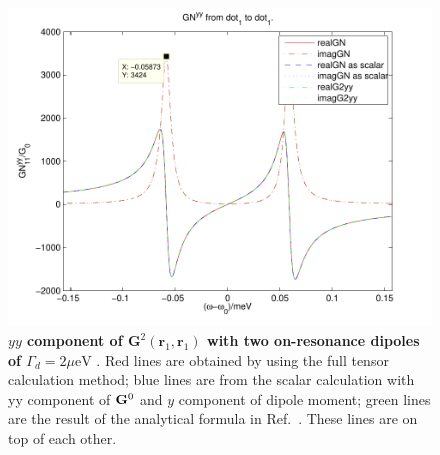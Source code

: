 \begin{figure}[H]
\centering
\begin{center}
\includegraphics[width=14cm]{./Figs/G84_2yy11_1}
\end{center}
\caption[yy component of $G^2(\mathbf{r}_1,\mathbf{r}_1)$  with two on-resonance dipoles.]{\textbf{$yy$ component of $\mathbf{G}^2(\mathbf{r}_1,\mathbf{r}_1)$  with two on-resonance dipoles of $\Gamma_d = 2 \mu{\text {eV}}$ }. Red lines are obtained by using the full tensor calculation method; blue lines are from the scalar calculation with yy component of $\mathbf{G}^0$ and $y$ component of dipole moment; green lines are the result of the analytical formula in Ref.~\cite{Yao2009c}. These lines are on top of each other. }
\label{G84_2yy11_1}
\end{figure}


